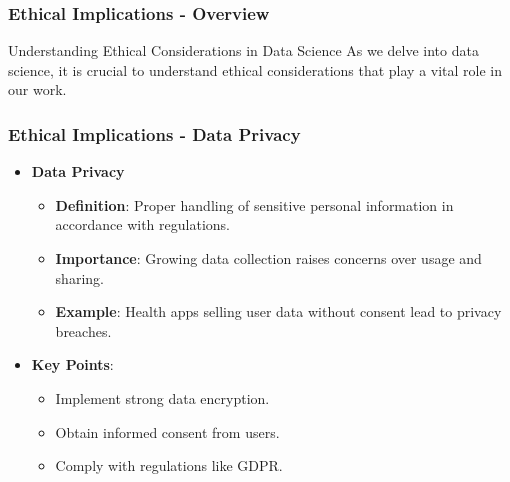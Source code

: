 \documentclass[aspectratio=169]{beamer}
\begin{document}
\begin{frame}[fragile]
    \frametitle{Ethical Implications - Overview}
    \begin{block}{Understanding Ethical Considerations in Data Science}
        As we delve into data science, it is crucial to understand ethical considerations that play a vital role in our work.
    \end{block}
\end{frame}

\begin{frame}[fragile]
    \frametitle{Ethical Implications - Data Privacy}
    \begin{itemize}
        \item \textbf{Data Privacy}
            \begin{itemize}
                \item \textbf{Definition}: Proper handling of sensitive personal information in accordance with regulations.
                \item \textbf{Importance}: Growing data collection raises concerns over usage and sharing.
                \item \textbf{Example}: Health apps selling user data without consent lead to privacy breaches.
            \end{itemize}
        \item \textbf{Key Points}:
            \begin{itemize}
                \item Implement strong data encryption.
                \item Obtain informed consent from users.
                \item Comply with regulations like GDPR.
            \end{itemize}
    \end{itemize}
\end{frame}
\end{document}
